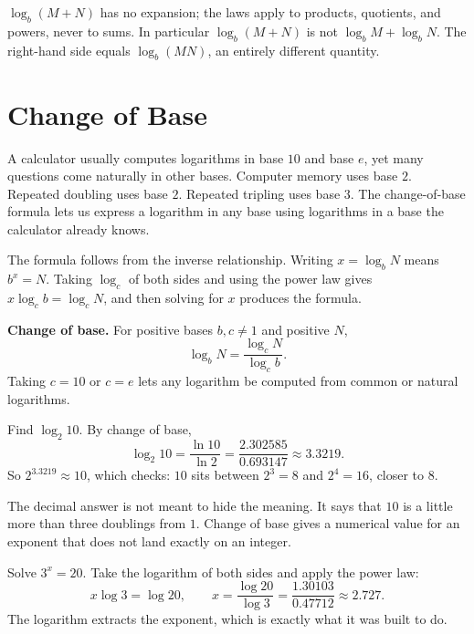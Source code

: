\documentclass[12pt]{book}
\begin{document}
\begin{pitfall}
$\log_b(M+N)$ has no expansion; the laws apply to products, quotients, and powers,
never to sums. In particular $\log_b(M+N)$ is not $\log_b M+\log_b N$. The right-hand
side equals $\log_b(MN)$, an entirely different quantity.
\end{pitfall}

\section{Change of Base}

A calculator usually computes logarithms in base $10$ and base $e$, yet many questions
come naturally in other bases. Computer memory uses base $2$. Repeated doubling uses
base $2$. Repeated tripling uses base $3$. The change-of-base formula lets us express a
logarithm in any base using logarithms in a base the calculator already knows.

The formula follows from the inverse relationship. Writing $x=\log_b N$ means
$b^{x}=N$. Taking $\log_c$ of both sides and using the power law gives
$x\log_c b=\log_c N$, and then solving for $x$ produces the formula.

\begin{keyidea}
\textbf{Change of base.} For positive bases $b,c\neq1$ and positive $N$,
\[
\log_b N=\frac{\log_c N}{\log_c b}.
\]
Taking $c=10$ or $c=e$ lets any logarithm be computed from common or natural
logarithms.
\end{keyidea}

\begin{example}
Find $\log_2 10$. By change of base,
\[
\log_2 10=\frac{\ln 10}{\ln 2}=\frac{2.302585}{0.693147}\approx 3.3219.
\]
So $2^{3.3219}\approx 10$, which checks: $10$ sits between $2^{3}=8$ and $2^{4}=16$,
closer to $8$.
\end{example}

The decimal answer is not meant to hide the meaning. It says that $10$ is a little more
than three doublings from $1$. Change of base gives a numerical value for an exponent
that does not land exactly on an integer.

\begin{example}
Solve $3^{x}=20$. Take the logarithm of both sides and apply the power law:
\[
x\log 3=\log 20,\qquad x=\frac{\log 20}{\log 3}=\frac{1.30103}{0.47712}\approx 2.727.
\]
The logarithm extracts the exponent, which is exactly what it was built to do.
\end{example}
\end{document}
